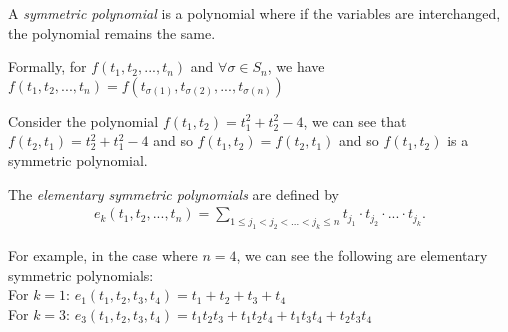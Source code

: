 \begin{definition}
    A \textit{symmetric polynomial} is a polynomial where if the variables are interchanged, the polynomial remains the same.

    Formally, for $f(t_1,t_2,...,t_n)$ and $\forall \sigma \in S_n$, we have $f(t_1,t_2,...,t_n) = f(t_{\sigma(1)},t_{\sigma(2)},...,t_{\sigma(n)})$
\end{definition}

\begin{example}
    Consider the polynomial 
    $f(t_1,t_2)=t_1^2+t_2^2-4$, we can see that $f(t_2,t_1)=t_2^2+t_1^2-4$ and so $f(t_1,t_2)=f(t_2,t_1)$ and so $f(t_1,t_2)$ is a symmetric polynomial.
\end{example}

\begin{definition}
    The \textit{elementary symmetric polynomials} are defined by 
    \begin{align*}
    e_k(t_1,t_2,...,t_n) = \sum_{1\leq j_1<j_2<...<j_k\leq n} t_{j_1}\cdot t_{j_2} \cdot ... \cdot t_{j_k}.
    \end{align*}
\end{definition}

\begin{example}
    For example, in the case where $n=4$, we can see the following are elementary symmetric polynomials:
    \\For $k=1$: $e_1(t_1,t_2,t_3,t_4) = t_1 + t_2 + t_3 + t_4$
    \\For $k=3$: $e_3(t_1,t_2,t_3,t_4) = t_1t_2t_3+t_1t_2t_4+t_1t_3t_4+t_2t_3t_4$
\end{example}